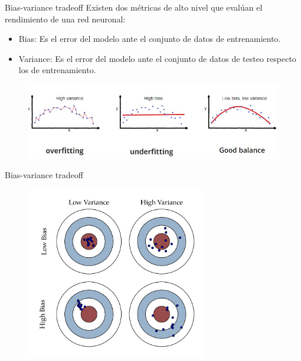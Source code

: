 \begin{frame}{Bias-variance tradeoff}
Existen dos \alert{métricas} de alto nivel que evalúan el rendimiento de una red neuronal:
\begin{itemize}
    \item \alert{Bias}: Es el error del modelo ante el conjunto de datos de \alert{entrenamiento}.
    \item \alert{Variance}: Es el error del modelo ante el conjunto de datos de \alert{testeo} respecto los de entrenamiento. 
\end{itemize}

\begin{figure}
\centering
    \includegraphics[width=\textwidth]{figures/Tema 3/BiasVariance_1.jpg}
    \caption{\cite{BiasVariance_1}}
\end{figure}
\end{frame}

\begin{frame}{Bias-variance tradeoff}
\begin{figure}
\centering
    \includegraphics[width=0.7\textwidth]{figures/Tema 3/BiasVariance.png}
    \caption{\cite{BiasVariance}}
\end{figure}
\end{frame}

